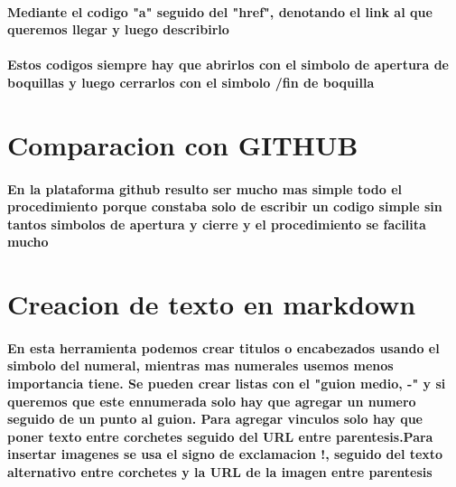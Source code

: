 \documentclass{article}
\begin{document}
\paragraph{Mediante el codigo "a" seguido del "href", denotando el link al que queremos llegar y luego describirlo}
\paragraph{Estos codigos siempre hay que abrirlos con el simbolo de apertura de boquillas y luego cerrarlos con el simbolo /fin de boquilla}
\section{\LARGE{Comparacion con GITHUB}}
\paragraph{En la plataforma github resulto ser mucho mas simple todo el procedimiento porque constaba solo de escribir un codigo simple sin tantos simbolos de apertura y cierre y el procedimiento se facilita mucho}
\section{\LARGE{Creacion de texto en markdown}}
\paragraph{En esta herramienta podemos crear titulos o encabezados usando el simbolo del numeral, mientras mas numerales usemos menos importancia tiene. Se pueden crear listas con el "guion medio, -" y si queremos que este ennumerada solo hay que agregar un numero seguido de un punto al guion. Para agregar vinculos solo hay que poner texto entre corchetes seguido del URL entre parentesis.Para insertar imagenes se usa el signo de exclamacion !, seguido del texto alternativo entre corchetes y la URL de la imagen entre parentesis }
\end{document}
